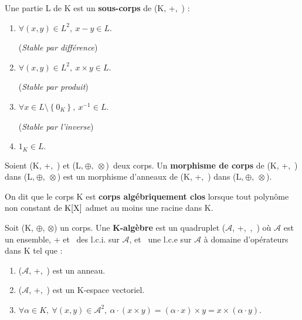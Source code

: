 \noindent Une partie L de K est un \textbf{sous-corps} de (K, +,\ \x) \ssi :
\begin{enumerate}[leftmargin=2cm]
    \item \(\forall(x,y)\in L^2,\ x-y\in L \). \ \;
    \begin{small}
        (\emph{Stable par différence})
    \end{small}\vspace{0.1cm}

    \item \(\forall(x,y)\in L^2,\ x\times y\in L \). \ \;
    \begin{small}
        (\emph{Stable par produit})
    \end{small}\vspace{0.1cm}

    \item \( \forall x\in L\setminus \left\{0_K\right\},\ x^{-1}\in L \). \ \
    \begin{small}
        (\emph{Stable par l'inverse})
    \end{small}\vspace{0.1cm}

    \item \(1_K\in L.\)
\end{enumerate}
\vspace{1cm}

Soient (K, +,\ \x) et (L,\(\ \oplus ,\ \otimes \))\, deux corps. Un \textbf{morphisme de corps} de (K, +,\ \x) dans (L,\(\ \oplus ,\ \otimes \)) est un morphisme d'anneaux de (K, +,\ \x) dans (L,\(\ \oplus ,\ \otimes \)).

\vspace{1cm}

On dit que le corps K est \textbf{corps algébriquement clos} lorsque tout polynôme non constant de $\text{K}[\text{X}]$ admet au moins une racine dans K.



\vspace{1.2cm}

Soit (K, \(\oplus\), \(\otimes\)) un corps. Une \textbf{K-algèbre} est un quadruplet (\(\mathcal{A}\), +,\ \x,\ \lce) où \(\mathcal{A}\) est un ensemble, + et \x \ des l.c.i. sur \(\mathcal{A}\), et \lce \ une l.c.e sur \(\mathcal{A}\) à domaine d'opérateurs dans K tel que :
\begin{enumerate}[leftmargin=2cm]
    \item (\(\mathcal{A}\), +,\ \x) est un anneau. \vspace{0.1cm}

    \item (\(\mathcal{A}\), +,\ \lce) est un K-espace vectoriel. \vspace{0.1cm}

    \item \( \forall \alpha \in K,\ \forall (x,y)\in \mathcal{A}^2,\ \alpha \cdot (x\times y) = (\alpha \cdot x) \times y = x\times (\alpha \cdot y).\)
\end{enumerate}

